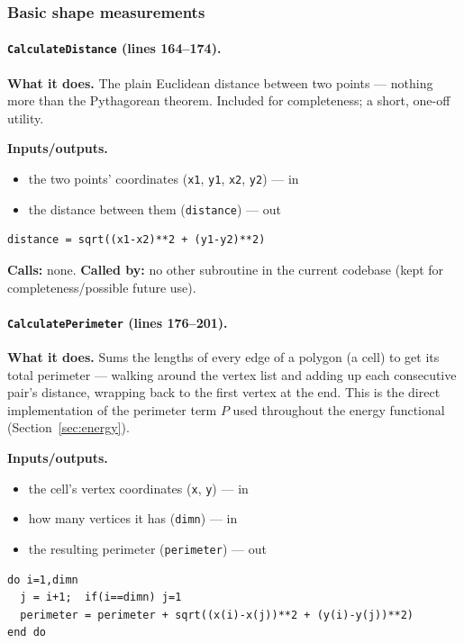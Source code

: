 \documentclass[11pt]{article}
\begin{document}
\subsubsection*{Basic shape measurements}

\paragraph{\texttt{CalculateDistance} (lines 164--174).}
\textbf{What it does.} The plain Euclidean distance between two points --- nothing more
than the Pythagorean theorem. Included for completeness; a short, one-off utility.

\textbf{Inputs/outputs.}
\begin{itemize}[nosep]
  \item the two points' coordinates (\texttt{x1}, \texttt{y1}, \texttt{x2}, \texttt{y2}) --- in
  \item the distance between them (\texttt{distance}) --- out
\end{itemize}

\begin{lstlisting}
distance = sqrt((x1-x2)**2 + (y1-y2)**2)
\end{lstlisting}

\textbf{Calls:} none. \textbf{Called by:} no other subroutine in the current codebase
(kept for completeness/possible future use).

\paragraph{\texttt{CalculatePerimeter} (lines 176--201).}
\textbf{What it does.} Sums the lengths of every edge of a polygon (a cell) to get its
total perimeter --- walking around the vertex list and adding up each consecutive pair's
distance, wrapping back to the first vertex at the end. This is the direct
implementation of the perimeter term $P$ used throughout the energy functional
(Section~\ref{sec:energy}).

\textbf{Inputs/outputs.}
\begin{itemize}[nosep]
  \item the cell's vertex coordinates (\texttt{x}, \texttt{y}) --- in
  \item how many vertices it has (\texttt{dimn}) --- in
  \item the resulting perimeter (\texttt{perimeter}) --- out
\end{itemize}

\begin{lstlisting}[caption={The edge-length summation in \texttt{CalculatePerimeter}.}]
do i=1,dimn
  j = i+1;  if(i==dimn) j=1
  perimeter = perimeter + sqrt((x(i)-x(j))**2 + (y(i)-y(j))**2)
end do
\end{lstlisting}
\end{document}
